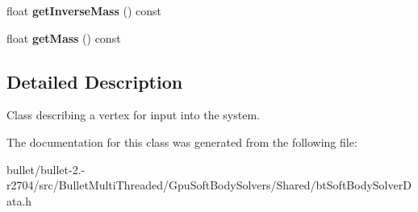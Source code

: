 \begin{DoxyCompactItemize}
\item 
\hypertarget{classbt_soft_body_vertex_data_1_1_vertex_description_a1fb94247071be96734ef7aaf2e5dc504}{float {\bfseries get\+Inverse\+Mass} () const }\label{classbt_soft_body_vertex_data_1_1_vertex_description_a1fb94247071be96734ef7aaf2e5dc504}

\item 
\hypertarget{classbt_soft_body_vertex_data_1_1_vertex_description_a527472ddd26cfb45cdabeaad965a41f3}{float {\bfseries get\+Mass} () const }\label{classbt_soft_body_vertex_data_1_1_vertex_description_a527472ddd26cfb45cdabeaad965a41f3}

\end{DoxyCompactItemize}


\subsection{Detailed Description}
Class describing a vertex for input into the system. 

The documentation for this class was generated from the following file\+:\begin{DoxyCompactItemize}
\item 
bullet/bullet-\/2.-\/r2704/src/\+Bullet\+Multi\+Threaded/\+Gpu\+Soft\+Body\+Solvers/\+Shared/bt\+Soft\+Body\+Solver\+Data.\+h\end{DoxyCompactItemize}
